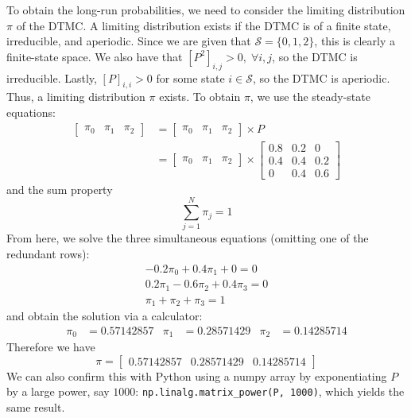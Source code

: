 \documentclass[12pt]{article}
\begin{document}
To obtain the long-run probabilities, we need to consider the limiting distribution $\pi$ of the DTMC. A limiting distribution exists if the DTMC is of a finite state, irreducible, and aperiodic. Since we are given that $\mathcal{S} = \{0,1,2\}$, this is clearly a finite-state space. We also have that $\left[ P^{2} \right]_{i,j} > 0, \; \forall i, j$, so the DTMC is irreducible. Lastly, $\left[ P \right]_{i,i} > 0$ for some state $i \in \mathcal{S}$, so the DTMC is aperiodic. Thus, a limiting distribution $\pi$ exists. To obtain $\pi$, we use the steady-state equations: \begin{align*}
    \begin{bmatrix}
        \pi_0 & \pi_1 & \pi_2
    \end{bmatrix} &= \begin{bmatrix}
        \pi_0 & \pi_1 & \pi_2
    \end{bmatrix} \times P \\ 
    &= \begin{bmatrix}
        \pi_0 & \pi_1 & \pi_2
    \end{bmatrix} \times \begin{bmatrix}
        0.8 & 0.2 & 0 \\ 
        0.4 & 0.4 & 0.2 \\ 
        0 & 0.4 & 0.6
    \end{bmatrix}
\end{align*} and the sum property \begin{equation*}
    \sum_{j=1}^{N} \pi_j = 1
\end{equation*} From here, we solve the three simultaneous equations (omitting one of the redundant rows): \begin{align}
    -0.2\pi_0 + 0.4 \pi_1 + 0 = 0 \\ 
    0.2\pi_1 - 0.6 \pi_2 + 0.4 \pi_3 = 0 \\ 
    \pi_1 + \pi_2 + \pi_3 = 1
\end{align} and obtain the solution via a calculator: \begin{align*}
    \pi_0 &= 0.57142857 & \pi_1 &= 0.28571429 & \pi_2 &= 0.14285714
\end{align*} Therefore we have \begin{equation}
    \pi = \begin{bmatrix}
        0.57142857 & 0.28571429 & 0.14285714
    \end{bmatrix}
\end{equation} We can also confirm this with Python using a numpy array by exponentiating $P$ by a large power, say $1000$: \texttt{np.linalg.matrix\_power(P, 1000)}, which yields the same result. 
\end{document}
